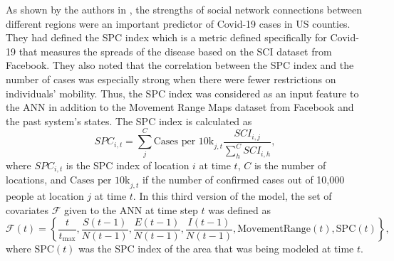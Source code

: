 As shown by the authors in \cite{kuchlerGeographicSpreadCOVID192020}, the strengths of social network connections between different regions were an important predictor of Covid-19 cases in US counties.
They had defined the \gls{SPC} index which is a metric defined specifically for Covid-19 that measures the spreads of the disease based on the \gls{SCI} dataset from Facebook.
They also noted that the correlation between the \gls{SPC} index and the number of cases was especially strong when there were fewer restrictions on individuals' mobility.
Thus, the \gls{SPC} index was considered as an input feature to the \gls{ANN} in addition to the Movement Range Maps dataset from Facebook and the past system's states.
The \gls{SPC} index is calculated as
\begin{equation*}
    SPC_{i,t} = \sum_j^C \text{Cases per 10k}_{j,t} \frac{SCI_{i,j}}{\sum_h^C SCI_{i,h}},
\end{equation*}
where $SPC_{i,t}$ is the \gls{SPC} index of location $i$ at time $t$, $C$ is the number of locations, and $\text{Cases per 10k}_{j,t}$ if the number of confirmed cases out of 10,000 people at location $j$ at time $t$.
In this third version of the model, the set of covariates $\mathcal{F}$ given to the \gls{ANN} at time step $t$ was defined as
\begin{equation*}
    \mathcal{F}(t) = \left\lbrace \frac{t}{t_\text{max}}, \frac{S(t-1)}{N(t-1)}, \frac{E(t-1)}{N(t-1)}, \frac{I(t-1)}{N(t-1)}, \text{MovementRange}(t), \text{SPC}(t) \right\rbrace,
\end{equation*}
where $\text{SPC}(t)$ was the \gls{SPC} index of the area that was being modeled at time $t$.